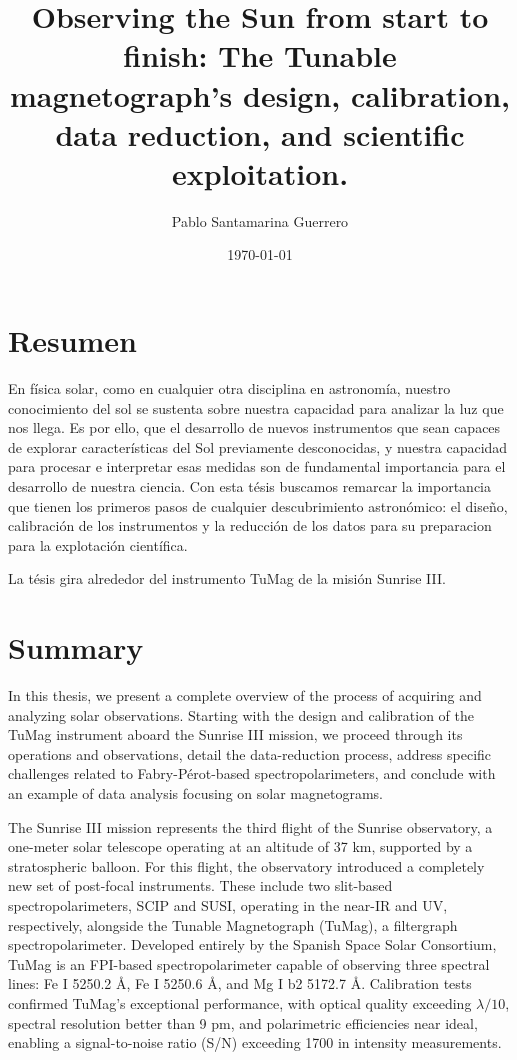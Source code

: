 \documentclass[12pt]{mythesis}
\title{Observing the Sun from start to finish: The Tunable magnetograph's design, calibration, data reduction, and scientific exploitation.}
\author{Pablo Santamarina Guerrero}
\date{\today}
\begin{document}
\frontmatter %
\maketitle
\cleardoublepage



\chapter*{Resumen}

En física solar, como en cualquier otra disciplina en astronomía, nuestro conocimiento del sol se sustenta sobre nuestra capacidad para analizar la luz que nos llega. Es por ello, que el desarrollo de nuevos instrumentos que sean capaces de explorar características del Sol previamente desconocidas, y nuestra capacidad para procesar e interpretar esas medidas son de fundamental importancia para el desarrollo de nuestra ciencia. Con esta tésis buscamos remarcar la importancia que tienen los primeros pasos de cualquier descubrimiento astronómico: el diseño, calibración de los instrumentos y la reducción de los datos para su preparacion para la explotación científica. 

La tésis gira alrededor del instrumento TuMag de la misión Sunrise III. 

\chapter*{Summary}

In this thesis, we present a complete overview of the process of acquiring and analyzing solar observations. Starting with the design and calibration of the TuMag instrument aboard the Sunrise III mission, we proceed through its operations and observations, detail the data-reduction process, address specific challenges related to Fabry-Pérot-based spectropolarimeters, and conclude with an example of data analysis focusing on solar magnetograms.

The Sunrise III mission represents the third flight of the Sunrise observatory, a one-meter solar telescope operating at an altitude of 37 km, supported by a stratospheric balloon. For this flight, the observatory introduced a completely new set of post-focal instruments. These include two slit-based spectropolarimeters, SCIP and SUSI, operating in the near-IR and UV, respectively, alongside the Tunable Magnetograph (TuMag), a filtergraph spectropolarimeter. Developed entirely by the Spanish Space Solar Consortium, TuMag is an FPI-based spectropolarimeter capable of observing three spectral lines: Fe I 5250.2 Å, Fe I 5250.6 Å, and Mg I b2 5172.7 Å. Calibration tests confirmed TuMag’s exceptional performance, with optical quality exceeding $\lambda/10$, spectral resolution better than 9 pm, and polarimetric efficiencies near ideal, enabling a signal-to-noise ratio (S/N) exceeding 1700 in intensity measurements.
\end{document}

